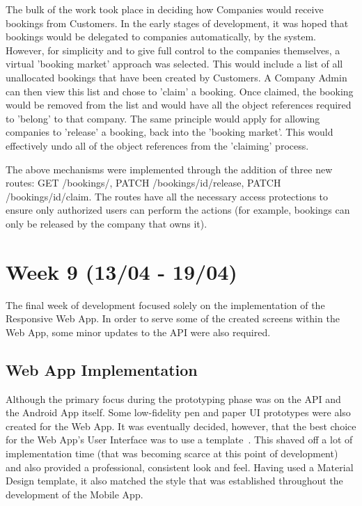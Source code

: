 The bulk of the work took place in deciding how Companies would receive bookings from Customers. In the early stages of development, it was hoped that bookings would be delegated to companies automatically, by the system. However, for simplicity and to give full control to the companies themselves, a virtual 'booking market' approach was selected. This would include a list of all unallocated bookings that have been created by Customers. A Company Admin can then view this list and chose to 'claim' a booking. Once claimed, the booking would be removed from the list and would have all the object references required to 'belong' to that company. The same principle would apply for allowing companies to 'release' a booking, back into the 'booking market'. This would effectively undo all of the object references from the 'claiming' process.

The above mechanisms were implemented through the addition of three new routes: GET /bookings/, PATCH /bookings/{id}/release, PATCH /bookings/{id}/claim. The routes have all the necessary access protections to ensure only authorized users can perform the actions (for example, bookings can only be released by the company that owns it).

\section{Week 9 (13/04 - 19/04)}
The final week of development focused solely on the implementation of the Responsive Web App. In order to serve some of the created screens within the Web App, some minor updates to the API were also required.

\subsection{Web App Implementation}
Although the primary focus during the prototyping phase was on the API and the Android App itself. Some low-fidelity pen and paper UI prototypes were also created for the Web App. It was eventually decided, however, that the best choice for the Web App's User Interface was to use a template~\cite{angular_material_documentation_ref}. This shaved off a lot of implementation time (that was becoming scarce at this point of development) and also provided a professional, consistent look and feel. Having used a Material Design template, it also matched the style that was established throughout the development of the Mobile App.

